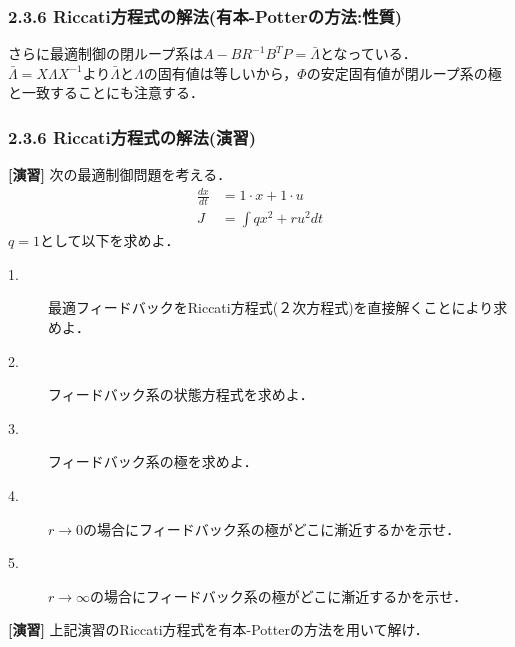 \begin{frame}[t]
\frametitle{2.3.6 Riccati方程式の解法(有本-Potterの方法:性質)}
さらに最適制御の閉ループ系は$A  - B R^{-1} B^T P = \bar{\Lambda}$となっている．
\\[3mm]

$\bar{\Lambda} = X \Lambda X^{-1}$より$\bar{\Lambda}$と$\Lambda$の固有値は等しいから，$\Phi$の安定固有値が閉ループ系の極と一致することにも注意する．\\

\end{frame}

\begin{frame}[t]
\frametitle{2.3.6 Riccati方程式の解法(演習)}
\noindent
{\bf [演習]}\nopagebreak
次の最適制御問題を考える．
\begin{align}
	\frac{dx}{dt} & = 1 \cdot x + 1 \cdot u
\nonumber \\
	J &= \int q x^2 + r u^2 dt
\end{align}
$q=1$として以下を求めよ．
\begin{description}
  \item[1.]  最適フィードバックをRiccati方程式(２次方程式)を直接解くことにより求めよ．
  \item[2.]  フィードバック系の状態方程式を求めよ．
  \item[3.]  フィードバック系の極を求めよ．
  \item[4.]  $r \rightarrow 0$の場合にフィードバック系の極がどこに漸近するかを示せ．
  \item[5.]  $r \rightarrow \infty$の場合にフィードバック系の極がどこに漸近するかを示せ．
\end{description}

\noindent
{\bf [演習]}\nopagebreak
上記演習のRiccati方程式を有本-Potterの方法を用いて解け．

\end{frame}

